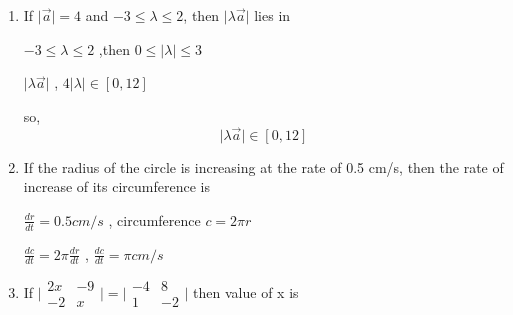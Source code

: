 \begin{enumerate}[label=\thesubsection.\arabic*, ref=\thesubsection.\theenumi]
\begin{enumerate}
\end{enumerate}
\solution

from \eqref{eq:ee26btech11222-prob 8}
\begin{align}
\vert{A^2}\vert{} = \vert{3A}\vert{} , \vert{A}\vert{} \neq 0
\end{align}

$$\vert{A}\vert=27$$

\begin{align}
	\textbf{codes/12/q9.py}
\end{align}
\item

If $\vert{}\vec{a}\vert{}=4$ and $-3\le\lambda\le2$, then $\vert{\lambda \vec{a}}\vert{}$ lies in
\begin{enumerate}
\end{enumerate}
\solution

$-3\le\lambda\le2$ ,then $0\le\vert{}\lambda\vert{}\le 3$ 

$\vert{}\lambda \vec{a}\vert{} $ , $4\vert{}\lambda\vert{} \in [0,12]$

so,$$\vert{}\lambda\vec{a}\vert{} \in [0,12]$$

\item

If the radius of the circle is increasing at the rate of 0.5 cm/s, then the rate of increase of its circumference is   

\solution

$\frac{dr}{dt} =0.5 cm/s$ , circumference $c=2\pi r$

$\frac{dc}{dt}= 2\pi \frac{dr}{dt}$ , $\frac{dc}{dt} = \pi cm/s$

\item 

If $\vert{}\begin{matrix}2x&-9\\ -2&x\end{matrix}\vert{}=\vert{}\begin{matrix}-4&8\\ 1&-2\end{matrix}\vert{}$ then value of x is   


\end{enumerate}
